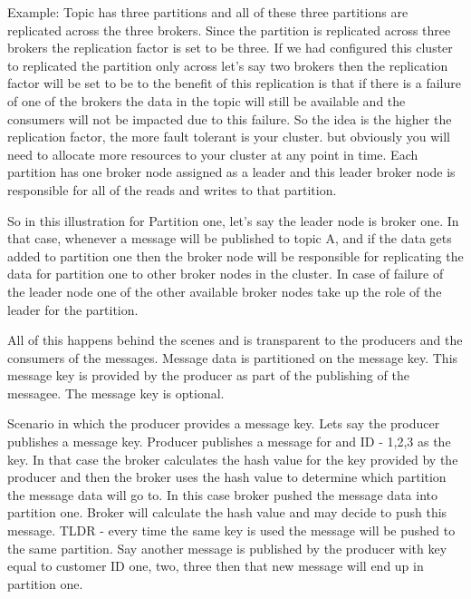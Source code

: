\documentclass[a4paper, 11pt]{book}
\begin{document}
    Example:
    Topic has three partitions and all of these three partitions are replicated across the three brokers.
    Since the partition is replicated across three brokers the replication factor is set to be three.
    If we had configured this cluster to replicated the partition only across let's say two brokers then the replication factor will be set to be to the benefit of this replication is that if there is a failure of one of the brokers the data in the topic will still be available and the consumers will not be impacted due to this failure.
    So the idea is the higher the replication factor, the more fault tolerant is your cluster.
    but obviously you will need to allocate more resources to your cluster at any point in time.
    Each partition has one broker node assigned as a leader and this leader broker node is responsible for all of the reads and writes to that partition.

    So in this illustration for Partition one, let's say the leader node is broker one.
    In that case, whenever a message will be published to topic A, and if the data gets added to partition one then the broker node will be responsible for replicating
    the data for partition one to other broker nodes in the cluster.
    In case of failure of the leader node one of the other available broker nodes take up the role of the leader for the partition.

    All of this happens behind the scenes and is transparent to the producers and the consumers of the messages.
    Message data is partitioned on the message key.
    This message key is provided by the producer as part of the publishing of the messagee.
    The message key is optional.

    Scenario in which the producer provides a message key.
    Lets say the producer publishes a message key.
    Producer publishes a message for and ID - 1,2,3 as the key.
    In that case the broker calculates the hash value for the key provided by the producer and then the broker uses the hash value to determine which partition the message data will go to.
    In this case broker pushed the message data into partition one.
    Broker will calculate the hash value and may decide to push this message.
    TLDR - every time the same key is used the message will be pushed to the same partition.
    Say another message is published by the producer with key equal to customer ID one, two, three then that new message will end up in partition one.
\end{document}
